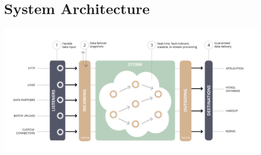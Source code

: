 \section{System Architecture}
\begin{center}
\includegraphics[scale=.7]{../img/img8} \\[2mm]
\end{center}
